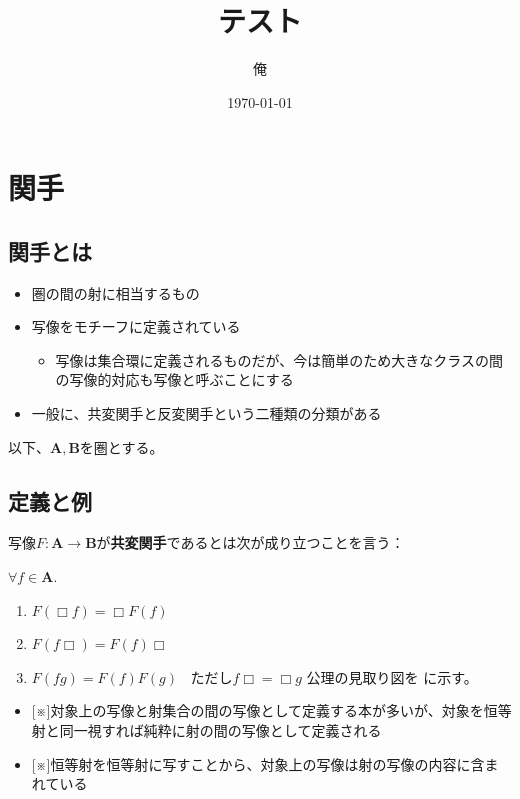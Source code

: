 \documentclass[5pt]{ltjsarticle}
\date{\today}
\author{俺}
\title{テスト}
\begin{document}
\maketitle
\section{関手}

\subsection{関手とは}

\begin{itemize}
\item
  圏の間の射に相当するもの
\item
  写像をモチーフに定義されている

  \begin{itemize}
  
  \item
    写像は集合環に定義されるものだが、今は簡単のため大きなクラスの間の写像的対応も写像と呼ぶことにする
  \end{itemize}
\item
  一般に、共変関手と反変関手という二種類の分類がある
\end{itemize}

以下、\(\mathbf{A},\mathbf{B}\)を圏とする。

\subsection{定義と例}


写像\(F:\mathbf{A} \to \mathbf{B}\)が\textbf{共変関手}であるとは次が成り立つことを言う：

\(\forall f \in \mathbf{A}.\)

\begin{enumerate}

\item
  \(F(\Box f) = \Box F(f)\)
\item
  \(F(f \Box) = F(f) \Box\)
\item
  \(F(fg) = F(f) F(g)\ \ \ \ \text{ただし} f \Box = \Box g\)
  公理の見取り図を に示す。
\end{enumerate}

\begin{itemize}
\item
  {[}※{]}対象上の写像と射集合の間の写像として定義する本が多いが、対象を恒等射と同一視すれば純粋に射の間の写像として定義される
\item
  {[}※{]}恒等射を恒等射に写すことから、対象上の写像は射の写像の内容に含まれている
\end{itemize}
\end{document}
